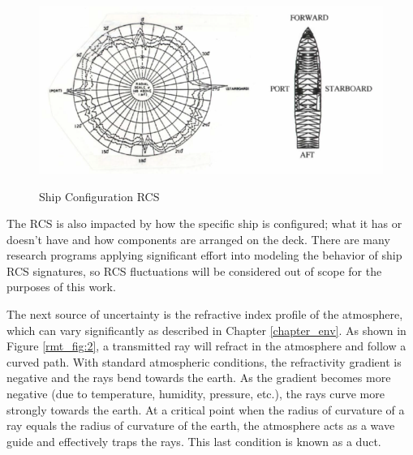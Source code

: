 \begin{figure}[H]
  \begin{center}
\includegraphics[width=4.5in]{../media/multistatic/shipconfig.png}
  \end{center}
  \renewcommand{\baselinestretch}{1} \small\normalsize
  \begin{quote}
    \caption[Ship Configuration RCS]{Ship Configuration RCS\label{rmt_fig:1}}
  \end{quote}
\end{figure}
\renewcommand{\baselinestretch}{2} \small\normalsize

The RCS is also impacted by how the specific ship is configured; what it has or doesn't have and how components are arranged on the deck. There are many research programs applying significant effort into modeling the behavior of ship RCS signatures, so RCS fluctuations will be considered out of scope for the purposes of this work.

The next source of uncertainty is the refractive index profile of the atmosphere, which can vary significantly as described in Chapter \ref{chapter_env}. As shown in Figure \ref{rmt_fig:2}, a transmitted ray will refract in the atmosphere and follow a curved path. With standard atmospheric conditions, the refractivity gradient is negative and the rays bend towards the earth. As the gradient becomes more negative (due to temperature, humidity, pressure, etc.), the rays curve more strongly towards the earth. At a critical point when the radius of curvature of a ray equals the radius of curvature of the earth, the atmosphere acts as a wave guide and effectively traps the rays. This last condition is known as a duct.

